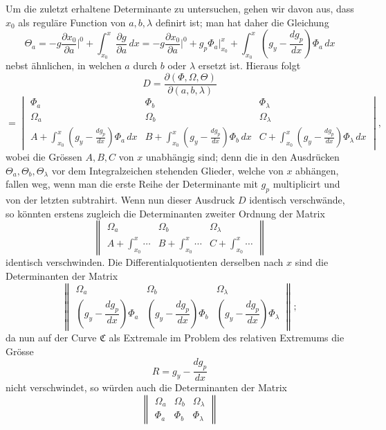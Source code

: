 \documentclass[11pt,a4paper,leqno]{article}
\begin{document}
Um die zuletzt erhaltene Determinante zu untersuchen, gehen wir davon aus, dass $x_0$ als reguläre Function von $a,b,\lambda$ definirt ist; man hat daher die Gleichung
\[
\Theta_a=-g\frac{\partial x_0}{\partial a}\bigg|^0+\int_{x_0}^{x}\frac{\partial g}{\partial a}\,dx
=-g\frac{\partial x_0}{\partial a}\bigg|^0+g_p\Phi_a\bigg|_{x_0}^{x}+\int_{x_0}^{x}\left(g_y-\frac{dg_p}{dx}\right)\Phi_a\,dx
\]
nebst ähnlichen, in welchen $a$ durch $b$ oder $\lambda$ ersetzt ist. Hieraus folgt
\[
D=\frac{\partial(\Phi,\Omega,\Theta)}{\partial(a,b,\lambda)}
\]
\[
=\begin{vmatrix}
\Phi_a&\Phi_b&\Phi_\lambda\\[.6ex]
\Omega_a&\Omega_b&\Omega_\lambda\\[.6ex]
A+\displaystyle\int_{x_0}^{x}\left(g_y-\frac{dg_p}{dx}\right)\Phi_a\,dx&B+\displaystyle\int_{x_0}^{x}\left(g_y-\frac{dg_p}{dx}\right)\Phi_b\,dx&C+\displaystyle\int_{x_0}^{x}\left(g_y-\frac{dg_p}{dx}\right)\Phi_\lambda\,dx
\end{vmatrix},
\]
wobei die Grössen $A,B,C$ von $x$ unabhängig sind; denn die in den Ausdrücken $\Theta_a,\Theta_b,\Theta_\lambda$ vor dem Integralzeichen stehenden Glieder, welche von $x$ abhängen, fallen weg, wenn man die erste Reihe der Determinante mit $g_p$ multiplicirt und von der letzten subtrahirt. Wenn nun dieser Ausdruck $D$ identisch verschwände, so könnten erstens zugleich die Determinanten zweiter Ordnung der Matrix
\begin{equation}\tag{53}
\left\|\begin{array}{ccc}
\Omega_a&\Omega_b&\Omega_\lambda\\[.8ex]
A+\displaystyle\int_{x_0}^{x}\cdots&B+\displaystyle\int_{x_0}^{x}\cdots&C+\displaystyle\int_{x_0}^{x}\cdots
\end{array}\right\|
\end{equation}
identisch verschwinden. Die Differentialquotienten derselben nach $x$ sind die Determinanten der Matrix
\[
\left\|\begin{array}{ccc}
\Omega_a&\Omega_b&\Omega_\lambda\\[.8ex]
\left(g_y-\dfrac{dg_p}{dx}\right)\Phi_a&
\left(g_y-\dfrac{dg_p}{dx}\right)\Phi_b&
\left(g_y-\dfrac{dg_p}{dx}\right)\Phi_\lambda
\end{array}\right\|;
\]
da nun auf der Curve $\mathfrak{C}$ als Extremale im Problem des relativen Extremums die Grösse
\[
R=g_y-\frac{dg_p}{dx}
\]
nicht verschwindet, so würden auch die Determinanten der Matrix
\[
\left\|\begin{array}{ccc}
\Omega_a&\Omega_b&\Omega_\lambda\\
\Phi_a&\Phi_b&\Phi_\lambda
\end{array}\right\|
\]
\end{document}
